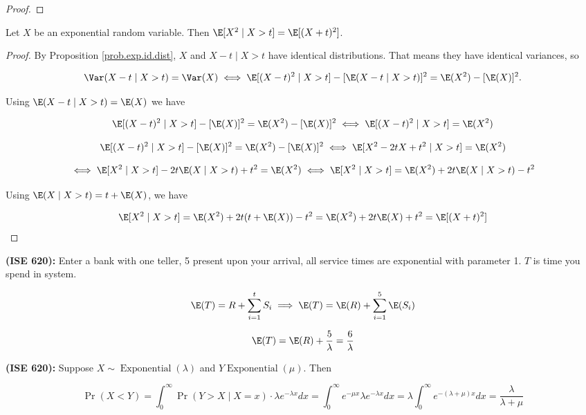 \begin{itemize}
\begin{proof}
\end{proof}


\begin{proposition} Let \(X\) be an exponential random variable. Then \( \E[X^2 \mid X >t ] = \E[(X + t)^2]\).

\end{proposition}


\begin{proof} By Proposition \ref{prob.exp.id.dist}, \(X\) and \(X - t \mid X > t\) have identical distributions. That means they have identical variances, so 

\[
\Var(X - t \mid X > t) = \Var(X) \iff \E[(X-t)^2 \mid X > t] - [\E(X-t \mid X > t)]^2 = \E(X^2)- [\E(X)]^2.
\]

Using \(\E(X-t \mid X > t) = \E(X)\) we have

\[
 \E[(X-t)^2 \mid X > t] - [\E(X)]^2 = \E(X^2)- [\E(X)]^2 \iff   \E[(X-t)^2 \mid X > t]   = \E(X^2)
\]

\[
 \E[(X-t)^2 \mid X > t] - [\E(X)]^2 = \E(X^2)- [\E(X)]^2 \iff  \E[X^2-2tX + t^2 \mid X > t]  = \E(X^2)
\]

\[
\iff \E[X^2 \mid X >t ] -2t \E(X \mid X > t)  + t^2 = \E(X^2) \iff \E[X^2 \mid X >t ] = \E(X^2) + 2 t \E(X \mid X > t) - t^2
\]

Using \(\E(X \mid X > t)  = t + \E(X)\), we have

\[
 \E[X^2 \mid X >t ] = \E(X^2) + 2 t(t + \E(X)) - t^2 = \E(X^2) + 2t \E(X) +  t^2 = \E[(X + t)^2]
\]
\end{proof}

\end{itemize}

\begin{example} \textbf{(ISE 620):} Enter a bank with one teller, 5 present upon your arrival, all service times are exponential with parameter 1. \(T\) is time you spend in system.

\[
\E(T) = R + \sum_{i=1}^t S_i \implies \E(T) = \E(R) + \sum_{i=1}^5 \E(S_i)
\]

\[
\E(T) = \E(R) + \frac{5}{\lambda} = \frac{6}{\lambda}
\]

\end{example}

\begin{example} \textbf{(ISE 620):} Suppose \(X \sim \operatorname{Exponential}(\lambda)\) and \(Y \operatorname{Exponential}(\mu)\). Then

\[
\Pr( X < Y) = \int_0^\infty \Pr(Y > X \mid X=x) \cdot \lambda e^{-\lambda x} dx = \int_0^\infty e^{- \mu x} \lambda e^{-\lambda x} dx = \lambda \int_0^\infty e ^{-(\lambda+\mu)x} dx = \boxed{\frac{\lambda}{\lambda+\mu}}
\]

\end{example}

